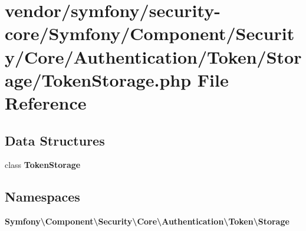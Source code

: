 \section{vendor/symfony/security-\/core/\+Symfony/\+Component/\+Security/\+Core/\+Authentication/\+Token/\+Storage/\+Token\+Storage.php File Reference}
\label{_token_storage_8php}
\subsection*{Data Structures}
\begin{DoxyCompactItemize}
\item 
class {\bf Token\+Storage}
\end{DoxyCompactItemize}
\subsection*{Namespaces}
\begin{DoxyCompactItemize}
\item 
 {\bf Symfony\textbackslash{}\+Component\textbackslash{}\+Security\textbackslash{}\+Core\textbackslash{}\+Authentication\textbackslash{}\+Token\textbackslash{}\+Storage}
\end{DoxyCompactItemize}
